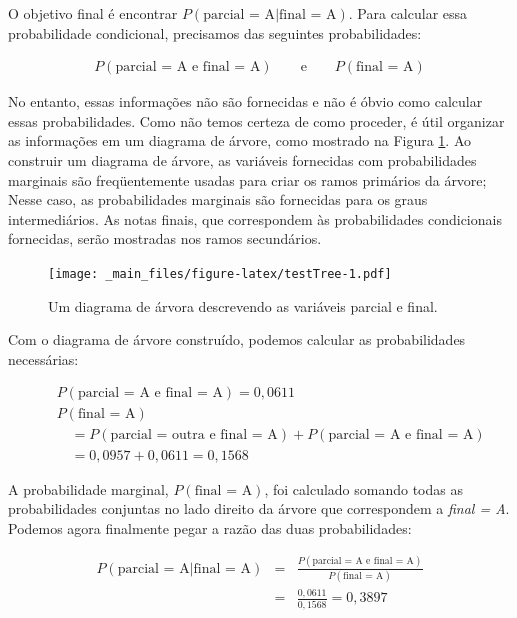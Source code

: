 \documentclass[
]{book}
\theoremstyle{definition}
\theoremstyle{definition}
\theoremstyle{definition}
\theoremstyle{definition}
\theoremstyle{remark}
\begin{document}
O objetivo final é encontrar \(P(\text{parcial = A} | \text{final = A})\). Para calcular essa probabilidade condicional, precisamos das seguintes probabilidades:

\begin{eqnarray*}
P(\text{parcial = A e final = A}) \qquad\text{e}\qquad
P(\text{final = A})
\end{eqnarray*}

No entanto, essas informações não são fornecidas e não é óbvio como calcular essas probabilidades. Como não temos certeza de como proceder, é útil organizar as informações em um diagrama de árvore, como mostrado na Figura \ref{fig:testTree}. Ao construir um diagrama de árvore, as variáveis fornecidas com probabilidades marginais são freqüentemente usadas para criar os ramos primários da árvore; Nesse caso, as probabilidades marginais são fornecidas para os graus intermediários. As notas finais, que correspondem às probabilidades condicionais fornecidas, serão mostradas nos ramos secundários.

\begin{figure}
\centering
\texttt{[image: \_main\_files/figure-latex/testTree-1.pdf]}
\caption{\label{fig:testTree}Um diagrama de árvora descrevendo as variáveis parcial e final.}
\end{figure}

Com o diagrama de árvore construído, podemos calcular as probabilidades necessárias:

\begin{eqnarray*}
&&P(\text{parcial = A e final = A}) = 0,0611 \\
&&P(\text{final = A})  \\
&& \quad= P(\text{parcial = outra e final = A}) + P(\text{parcial = A e final = A}) \\
&& \quad= 0,0957 + 0,0611  = 0,1568
\end{eqnarray*}

A probabilidade marginal, \(P(\text{final = A})\), foi calculado somando todas as probabilidades conjuntas no lado direito da árvore que correspondem a \emph{final = A}. Podemos agora finalmente pegar a razão das duas probabilidades:

\begin{eqnarray*}
P(\text{parcial = A} | \text{final = A}) &=& \frac{P(\text{parcial = A e final = A})}{P(\text{final = A})} \\
&=& \frac{0,0611}{0,1568} = 0,3897
\end{eqnarray*}
\end{document}

